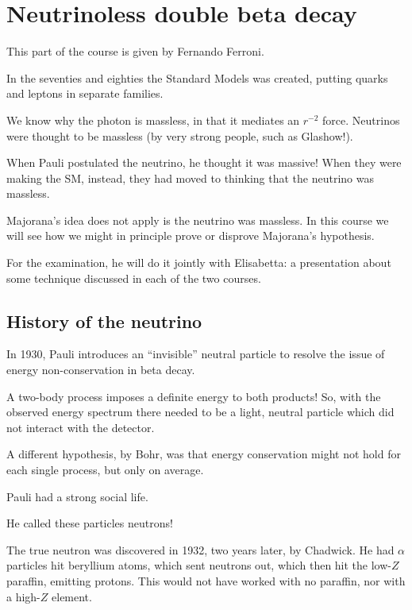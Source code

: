 \documentclass[main.tex]{subfiles}
\begin{document}
\section{Neutrinoless double beta decay}


This part of the course is given by Fernando Ferroni. 

In the seventies and eighties the Standard Models was created, 
putting quarks and leptons in separate families. 

We know why the photon is massless, in that it mediates an \(r^{-2}\) force. 
Neutrinos were thought to be massless (by very strong people, such as Glashow!). 

When Pauli postulated the neutrino, he thought it was massive! 
When they were making the SM, instead, 
they had moved to thinking that the neutrino was massless. 

Majorana's idea does not apply is the neutrino was massless.
In this course we will see how we might in principle prove or disprove Majorana's hypothesis. 

For the examination, he will do it jointly with Elisabetta:
a presentation about some technique discussed in each of the two courses.

\subsection{History of the neutrino}

In 1930, Pauli introduces an ``invisible'' neutral particle 
to resolve the issue of energy non-conservation in beta decay.

A two-body process imposes a definite energy to both products! 
So, with the observed energy spectrum there needed to be a light,
neutral particle which did not interact with the detector. 

A different hypothesis, by Bohr, was that energy conservation might 
not hold for each single process, but only on average. 

Pauli had a strong social life. 


He called these particles neutrons! 

The true neutron was discovered in 1932, two years later,
by Chadwick. 
He had \(\alpha \) particles hit beryllium atoms, which sent neutrons out,
which then hit the low-\(Z\) paraffin, emitting protons. 
This would not have worked with no paraffin, nor with a high-\(Z\) element. 
\end{document}
